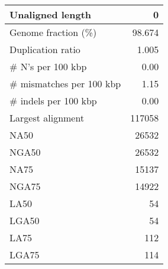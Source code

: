 \documentclass[12pt,a4paper]{article}
\begin{document}
\begin{table}[ht]
\begin{center}
\begin{tabular}{|l*{1}{|r}|}
Unaligned length & 0 \\ \hline
Genome fraction (\%) & 98.674 \\ \hline
Duplication ratio & 1.005 \\ \hline
\# N's per 100 kbp & 0.00 \\ \hline
\# mismatches per 100 kbp & 1.15 \\ \hline
\# indels per 100 kbp & 0.00 \\ \hline
Largest alignment & 117058 \\ \hline
NA50 & 26532 \\ \hline
NGA50 & 26532 \\ \hline
NA75 & 15137 \\ \hline
NGA75 & 14922 \\ \hline
LA50 & 54 \\ \hline
LGA50 & 54 \\ \hline
LA75 & 112 \\ \hline
LGA75 & 114 \\ \hline
\end{tabular}
\end{center}
\end{table}
\end{document}
